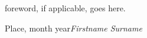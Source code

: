 %
%

\foreword

foreword, if applicable, goes here.

\vspace{\baselineskip}
\begin{flushright}\noindent
Place, month year\hfill {\it Firstname  Surname}\\
\end{flushright}


